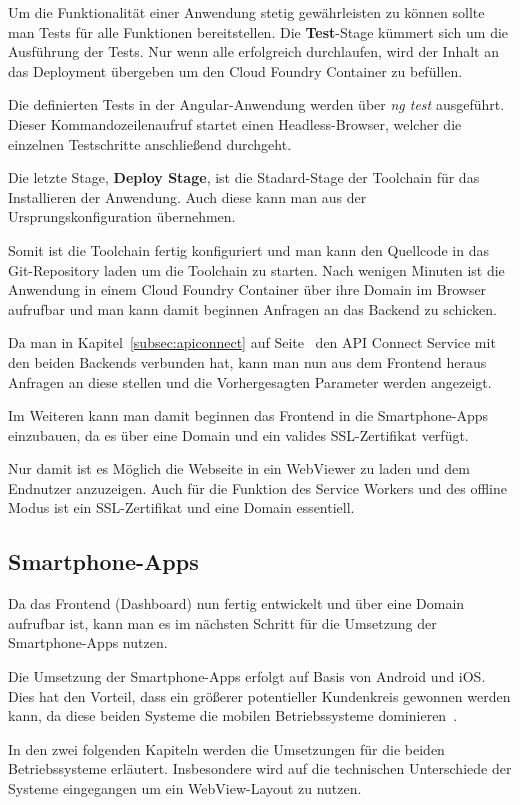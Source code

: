 Um die Funktionalität einer Anwendung stetig gewährleisten zu können sollte man Tests für alle Funktionen bereitstellen.
Die \textbf{Test}-Stage kümmert sich um die Ausführung der Tests. Nur wenn alle erfolgreich durchlaufen, wird der Inhalt
an das Deployment übergeben um den Cloud Foundry Container zu befüllen.

Die definierten Tests in der Angular-Anwendung werden über \textit{ng test} ausgeführt. Dieser Kommandozeilenaufruf
startet einen Headless-Browser, welcher die einzelnen Testschritte anschließend durchgeht.

Die letzte Stage, \textbf{Deploy Stage}, ist die Stadard-Stage der Toolchain für das Installieren der Anwendung. Auch
diese kann man aus der Ursprungskonfiguration übernehmen.

Somit ist die Toolchain fertig konfiguriert und man kann den Quellcode in das Git-Repository laden um die Toolchain zu
starten. Nach wenigen Minuten ist die Anwendung in einem Cloud Foundry Container über ihre Domain im Browser aufrufbar
und man kann damit beginnen Anfragen an das Backend zu schicken.

Da man in Kapitel~\ref{subsec:apiconnect} auf Seite~\pageref{subsec:apiconnect} den API Connect Service mit den beiden
Backends verbunden hat, kann man nun aus dem Frontend heraus Anfragen an diese stellen und die Vorhergesagten Parameter
werden angezeigt.

Im Weiteren kann man damit beginnen das Frontend in die Smartphone-Apps einzubauen, da es über eine Domain und ein
valides SSL-Zertifikat verfügt.

Nur damit ist es Möglich die Webseite in ein WebViewer zu laden und dem Endnutzer anzuzeigen. Auch für die
Funktion des Service Workers und des offline Modus ist ein SSL-Zertifikat und eine Domain essentiell.

\subsection{Smartphone-Apps}
Da das Frontend (Dashboard) nun fertig entwickelt und über eine Domain aufrufbar ist, kann man es im nächsten Schritt
für die Umsetzung der Smartphone-Apps nutzen.

Die Umsetzung der Smartphone-Apps erfolgt auf Basis von Android und iOS. Dies hat den Vorteil, dass ein größerer
potentieller Kundenkreis gewonnen werden kann, da diese beiden Systeme die mobilen Betriebssysteme
dominieren~\cite{online_umsetzung_mobileos}.

In den zwei folgenden Kapiteln werden die Umsetzungen für die beiden Betriebssysteme erläutert. Insbesondere wird auf
die technischen Unterschiede der Systeme eingegangen um ein WebView-Layout zu nutzen.

